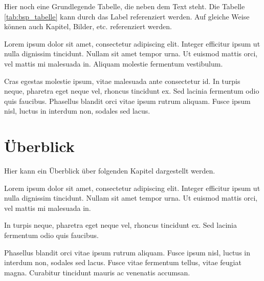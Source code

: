 Hier noch eine Grundlegende Tabelle, die neben dem Text steht.
Die Tabelle \ref{tab:bsp_tabelle} kann durch das Label referenziert werden.
Auf gleiche Weise können auch Kapitel, Bilder, etc. referenziert werden.

Lorem ipsum dolor sit amet, consectetur adipiscing elit. Integer efficitur ipsum ut nulla dignissim tincidunt. Nullam sit amet tempor urna. Ut euismod mattis orci, vel mattis mi malesuada in. Aliquam molestie fermentum vestibulum. 

Cras egestas molestie ipsum, vitae malesuada ante consectetur id. In turpis neque, pharetra eget neque vel, rhoncus tincidunt ex. Sed lacinia fermentum odio quis faucibus. Phasellus blandit orci vitae ipsum rutrum aliquam. Fusce ipsum nisl, luctus in interdum non, sodales sed lacus. 


\clearpage

\section{Überblick}
\label{kap:ueberblick}

Hier kann ein Überblick über folgenden Kapitel dargestellt werden.

Lorem ipsum dolor sit amet, consectetur adipiscing elit. Integer efficitur ipsum ut nulla dignissim tincidunt. Nullam sit amet tempor urna. Ut euismod mattis orci, vel mattis mi malesuada in.

In turpis neque, pharetra eget neque vel, rhoncus tincidunt ex. Sed lacinia fermentum odio quis faucibus. 

Phasellus blandit orci vitae ipsum rutrum aliquam. Fusce ipsum nisl, luctus in interdum non, sodales sed lacus. Fusce vitae fermentum tellus, vitae feugiat magna. Curabitur tincidunt mauris ac venenatis accumsan. 